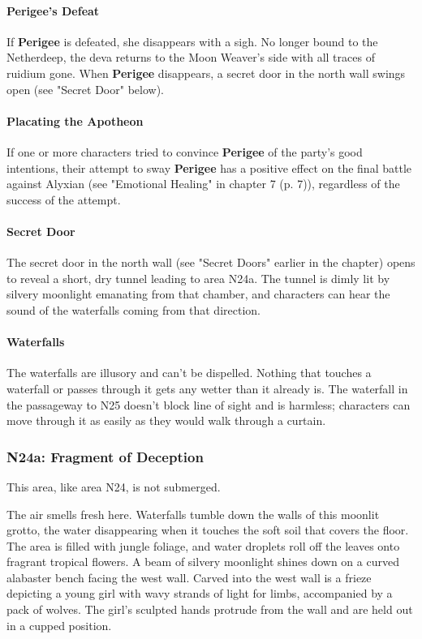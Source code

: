 \documentclass[a4paper, 11pt, bg=full, twocolumn, nooutline]{dndbook}
\begin{document}
\paragraph{Perigee's Defeat}

If \textbf{Perigee} is defeated, she disappears with a sigh. No longer bound to the Netherdeep, the deva returns to the Moon Weaver's side with all traces of ruidium gone. When \textbf{Perigee} disappears, a secret door in the north wall swings open (see "Secret Door" below).

\paragraph{Placating the Apotheon}

If one or more characters tried to convince \textbf{Perigee} of the party's good intentions, their attempt to sway \textbf{Perigee} has a positive effect on the final battle against Alyxian (see "Emotional Healing" in chapter 7 (p. 7)), regardless of the success of the attempt.

\paragraph{Secret Door}

The secret door in the north wall (see "Secret Doors" earlier in the chapter) opens to reveal a short, dry tunnel leading to area N24a. The tunnel is dimly lit by silvery moonlight emanating from that chamber, and characters can hear the sound of the waterfalls coming from that direction.

\paragraph{Waterfalls}

The waterfalls are illusory and can't be dispelled. Nothing that touches a waterfall or passes through it gets any wetter than it already is. The waterfall in the passageway to N25 doesn't block line of sight and is harmless; characters can move through it as easily as they would walk through a curtain.

\subsubsection{N24a: Fragment of Deception}

This area, like area N24, is not submerged.

\begin{DndReadAloud}
The air smells fresh here. Waterfalls tumble down the walls of this moonlit grotto, the water disappearing when it touches the soft soil that covers the floor. The area is filled with jungle foliage, and water droplets roll off the leaves onto fragrant tropical flowers.
A beam of silvery moonlight shines down on a curved alabaster bench facing the west wall. Carved into the west wall is a frieze depicting a young girl with wavy strands of light for limbs, accompanied by a pack of wolves. The girl's sculpted hands protrude from the wall and are held out in a cupped position.
\end{DndReadAloud}
\end{document}
